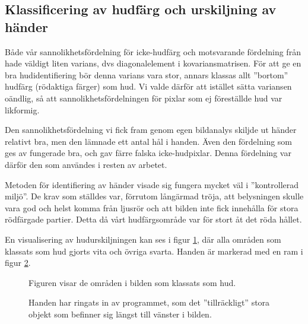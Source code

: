 \documentclass[../rapport_MVEX01-11-05]{subfiles}
\begin{document}
\subsection{Klassificering av hudfärg och urskiljning av händer}
Både vår sannolikhetsfördelning för icke-hudfärg och motsvarande
fördelning från  hade väldigt liten varians,
dvs diagonalelement i kovariansmatrisen. För att ge en bra
hudidentifiering bör denna varians vara stor, annars klassas allt
''bortom'' hudfärg (rödaktiga färger) som hud. Vi valde därför att
istället sätta variansen oändlig, så att sannolikhetsfördelningen för
pixlar som ej föreställde hud var likformig.

Den sannolikhetsfördelning vi fick fram genom egen bildanalys skiljde
ut händer relativt bra, men den lämnade ett antal hål i handen. Även
den fördelning som ges av  fungerade bra, och
gav färre falska icke-hudpixlar. Denna fördelning var därför den som
användes i resten av arbetet. 

Metoden för identifiering av händer visade sig fungera mycket väl i
''kontrollerad miljö''. De krav som ställdes var, förrutom långärmad
tröja, att belysningen skulle vara god och helst komma från ljusrör
och att bilden inte fick innehålla för stora rödfärgade partier. Detta
då vårt hudfärgsområde var för stort åt det röda hållet. 

En visualisering av hudurskiljningen kan ses i figur
\ref{fig:hudklassificering}, där alla områden som klassats som hud
gjorts vita och övriga svarta. Handen är markerad med en ram i figur
\ref{fig:handklassificering}.

\begin{figure}
	  \centering
		\label{fig:hudklassificering}
		\caption{Figuren visar de områden i bilden som
                  klassats som hud.}
\end{figure}

\begin{figure}
	  \centering
		\label{fig:handklassificering}
		\caption{Handen har ringats in av programmet, som det
                  ''tillräckligt'' stora objekt som befinner sig
                  längst till vänster i bilden.}
\end{figure}
\end{document}
